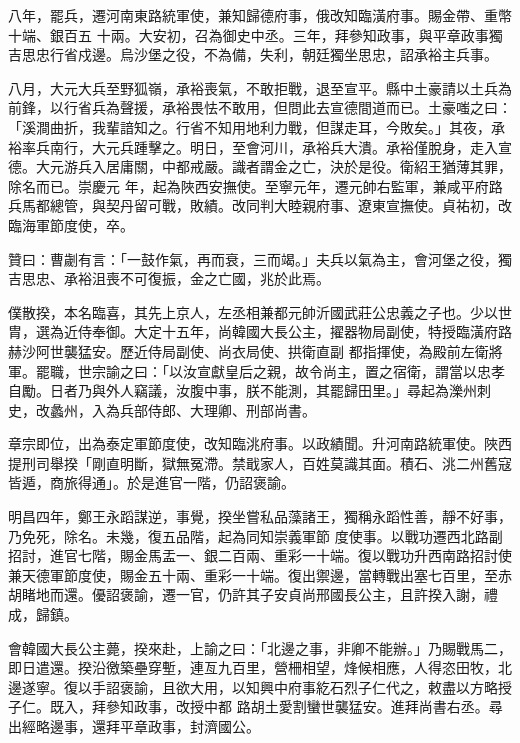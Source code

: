 \begin{pinyinscope}
 八年，罷兵，遷河南東路統軍使，兼知歸德府事，俄改知臨潢府事。賜金帶、重幣十端、銀百五
 十兩。大安初，召為御史中丞。三年，拜參知政事，與平章政事獨吉思忠行省戍邊。烏沙堡之役，不為備，失利，朝廷獨坐思忠，詔承裕主兵事。



 八月，大元大兵至野狐嶺，承裕喪氣，不敢拒戰，退至宣平。縣中土豪請以土兵為前鋒，以行省兵為聲援，承裕畏怯不敢用，但問此去宣德間道而已。土豪嗤之曰：「溪澗曲折，我輩諳知之。行省不知用地利力戰，但謀走耳，今敗矣。」其夜，承裕率兵南行，大元兵踵擊之。明日，至會河川，承裕兵大潰。承裕僅脫身，走入宣德。大元游兵入居庸關，中都戒嚴。識者謂金之亡，決於是役。衛紹王猶薄其罪，除名而已。崇慶元
 年，起為陜西安撫使。至寧元年，遷元帥右監軍，兼咸平府路兵馬都總管，與契丹留可戰，敗績。改同判大睦親府事、遼東宣撫使。貞祐初，改臨海軍節度使，卒。



 贊曰：曹劌有言：「一鼓作氣，再而衰，三而竭。」夫兵以氣為主，會河堡之役，獨吉思忠、承裕沮喪不可復振，金之亡國，兆於此焉。



 僕散揆，本名臨喜，其先上京人，左丞相兼都元帥沂國武莊公忠義之子也。少以世胄，選為近侍奉御。大定十五年，尚韓國大長公主，擢器物局副使，特授臨潢府路赫沙阿世襲猛安。歷近侍局副使、尚衣局使、拱衛直副
 都指揮使，為殿前左衛將軍。罷職，世宗諭之曰：「以汝宣獻皇后之親，故令尚主，置之宿衛，謂當以忠孝自勵。日者乃與外人竊議，汝腹中事，朕不能測，其罷歸田里。」尋起為濼州刺史，改蠡州，入為兵部侍郎、大理卿、刑部尚書。



 章宗即位，出為泰定軍節度使，改知臨洮府事。以政績聞。升河南路統軍使。陜西提刑司舉揆「剛直明斷，獄無冤滯。禁戢家人，百姓莫識其面。積石、洮二州舊寇皆遁，商旅得通」。於是進官一階，仍詔褒諭。



 明昌四年，鄭王永蹈謀逆，事覺，揆坐嘗私品藻諸王，獨稱永蹈性善，靜不好事，乃免死，除名。未幾，復五品階，起為同知崇義軍節
 度使事。以戰功遷西北路副招討，進官七階，賜金馬盂一、銀二百兩、重彩一十端。復以戰功升西南路招討使兼天德軍節度使，賜金五十兩、重彩一十端。復出禦邊，當轉戰出塞七百里，至赤胡睹地而還。優詔褒諭，遷一官，仍許其子安貞尚邢國長公主，且許揆入謝，禮成，歸鎮。



 會韓國大長公主薨，揆來赴，上諭之曰：「北邊之事，非卿不能辦。」乃賜戰馬二，即日遣還。揆沿徼築壘穿塹，連亙九百里，營柵相望，烽候相應，人得恣田牧，北邊遂寧。復以手詔褒諭，且欲大用，以知興中府事紇石烈子仁代之，敕盡以方略授子仁。既入，拜參知政事，改授中都
 路胡土愛割蠻世襲猛安。進拜尚書右丞。尋出經略邊事，還拜平章政事，封濟國公。




\end{pinyinscope}
